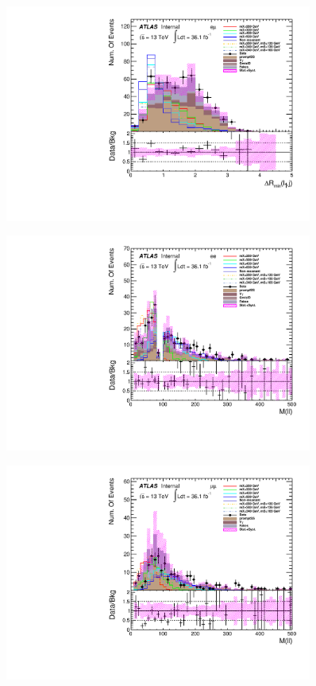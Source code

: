 \begin{figure}[h]
\begin{minipage}[t]{0.33\linewidth}
 \end{minipage}
  \begin{minipage}[t]{0.33\linewidth}
 \centering
 \includegraphics[width=0.9\textwidth,angle=-90]{fig/dataMC_high_Njet_CR/mindR_l1j_emu.pdf}\label{fig:dataMC_high_Njet_CR:mindRl1j_emu.pdf}
 \end{minipage}
\begin{minipage}[t]{0.33\linewidth}
 \centering
 \includegraphics[width=0.9\textwidth,angle=-90]{fig/dataMC_high_Njet_CR/m_ll_ee.pdf}
 \label{fig:dataMC_high_Njet_CR:m_ll_ee.pdf}
 \end{minipage}
 \begin{minipage}[t]{0.33\linewidth}
 \centering
 \includegraphics[width=0.9\textwidth,angle=-90]{fig/dataMC_high_Njet_CR/m_ll_mumu.pdf}

\end{minipage}
\end{figure}
